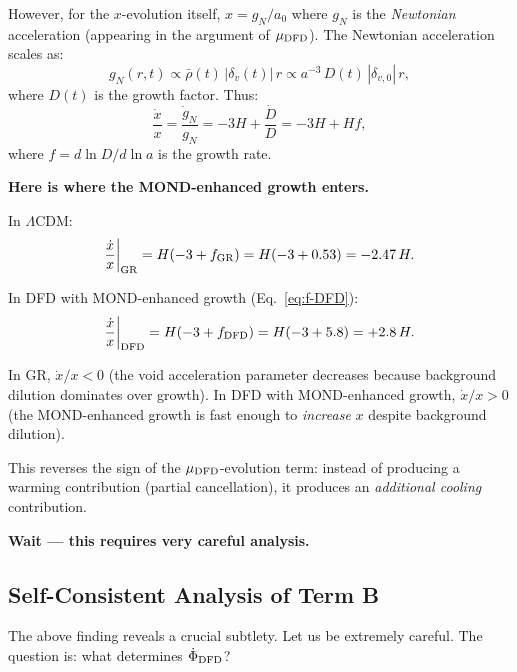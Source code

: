 \documentclass[11pt,a4paper]{article}
\newcommand{\LCDM}{$\Lambda$CDM}
\newcommand{\aM}{a_0}
\newcommand{\mufd}{\mu_{\rm DFD}}
\newcounter{findingctr}
\newenvironment{finding}[1][]{%
  \refstepcounter{findingctr}%
  \begin{tcolorbox}[colback=blue!3!white, colframe=blue!50!black,
    title=\textbf{Finding \thefindingctr: #1}]
}{%
  \end{tcolorbox}%
}
\begin{document}
However, for the $x$-evolution itself, $x = g_N/\aM$ where $g_N$ is
the \emph{Newtonian} acceleration (appearing in the argument of
$\mufd$). The Newtonian acceleration scales as:
\begin{equation}
g_N(r,t) \propto \bar{\rho}(t)\,|\delta_v(t)|\,r
\propto a^{-3}\,D(t)\,|\delta_{v,0}|\,r,
\end{equation}
where $D(t)$ is the growth factor. Thus:
\begin{equation}
\frac{\dot{x}}{x} = \frac{\dot{g}_N}{g_N}
= -3H + \frac{\dot{D}}{D}
= -3H + Hf,
\label{eq:xdot-over-x}
\end{equation}
where $f = d\ln D/d\ln a$ is the growth rate.

\textbf{Here is where the MOND-enhanced growth enters.}

In \LCDM:
\begin{equation}
\frac{\dot{x}}{x}\bigg|_{\rm GR} = H(-3 + f_{\rm GR})
= H(-3 + 0.53) = -2.47\,H.
\end{equation}

In DFD with MOND-enhanced growth (Eq.~\ref{eq:f-DFD}):
\begin{equation}
\frac{\dot{x}}{x}\bigg|_{\rm DFD} = H(-3 + f_{\rm DFD})
= H(-3 + 5.8) = +2.8\,H.
\label{eq:xdot-DFD}
\end{equation}

\begin{finding}[Sign Reversal of $\dot{x}$]
\label{find:sign-reversal}
In GR, $\dot{x}/x < 0$ (the void acceleration parameter decreases
because background dilution dominates over growth). In DFD with
MOND-enhanced growth, $\dot{x}/x > 0$ (the MOND-enhanced growth is
fast enough to \emph{increase} $x$ despite background dilution).

This reverses the sign of the $\mufd$-evolution term: instead of
producing a warming contribution (partial cancellation), it produces
an \emph{additional cooling} contribution.

\textbf{Wait --- this requires very careful analysis.}
\end{finding}

\subsection{Self-Consistent Analysis of Term B}
\label{sec:self-consistent}

The above finding reveals a crucial subtlety. Let us be extremely
careful. The question is: what determines $\dot{\Phi}_{\rm DFD}$?
\end{document}
